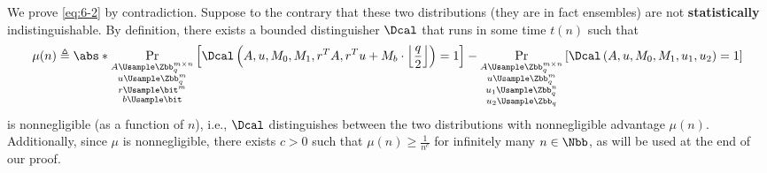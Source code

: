 \begin{answer}[ii]
    We prove \eqref{eq:6-2} by contradiction. Suppose to the contrary that these two distributions (they are in fact ensembles) are not \textbf{statistically} indistinguishable. By definition, there exists a bounded distinguisher $\Dcal$ that runs in some time $t(n)$ such that
    \begin{equation}\label{eq:p6-2-1}
        \mu(n)\triangleq \abs*{\Pr_{\substack{A\Usample\Zbb_q^{m\times n}\\u\Usample\Zbb_q^m\\r\Usample\bit^m\\b\Usample\bit}}\left[\Dcal\left(A, u, M_0, M_1, r^TA, r^Tu + M_b \cdot \left\lfloor\frac{q}{2}\right\rfloor\right)=1\right]
        -\Pr_{\substack{A\Usample\Zbb_q^{m\times n}\\u\Usample\Zbb_q^m\\u_1\Usample\Zbb_q^n\\u_2\Usample\Zbb_q}}\left[\Dcal\left(A, u, M_0, M_1, u_1, u_2\right)=1\right]}
    \end{equation}
    is nonnegligible (as a function of $n$), i.e., $\Dcal$ distinguishes between the two distributions with nonnegligible advantage $\mu(n)$.
    Additionally, since $\mu$ is nonnegligible, there exists $c\gt 0$ such that $\mu(n)\ge \frac{1}{n^c}$ for infinitely many $n\in\Nbb$, as will be used at the end of our proof.

    



\end{answer}
